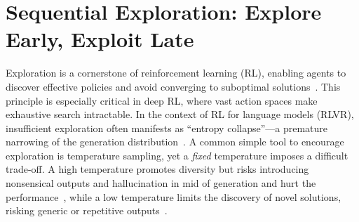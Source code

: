 \documentclass{article} %
\newcommand{\ych}[1]{\textcolor{purple}{[#1 -Chenghao]}}
\begin{document}
\section{Sequential Exploration: Explore Early, Exploit Late}
\label{sec:exploitation-vs-exploration}
Exploration is a cornerstone of reinforcement learning (RL), enabling agents to discover effective policies and avoid converging to suboptimal solutions~\citep{sutton1998reinforcement, ladosz2022exploration}. This principle is especially critical in deep RL, where vast action spaces make exhaustive search intractable. In the context of RL for language models (RLVR), insufficient exploration often manifests as ``entropy collapse''—a premature narrowing of the generation distribution~\citep{yu2025dapo, wang2025beyond, cui2025entropy}. A common simple tool to encourage exploration is temperature sampling, yet a \textit{fixed} temperature imposes a difficult trade-off. A high temperature promotes diversity but risks introducing nonsensical outputs and hallucination in mid of generation and hurt the performance~\citep{renze-2024-effect, wang2025beyond}, while a low temperature limits the discovery of novel solutions, risking generic or repetitive outputs~\citep{Holtzman2020The, guo2025deepseek}.
\end{document}
